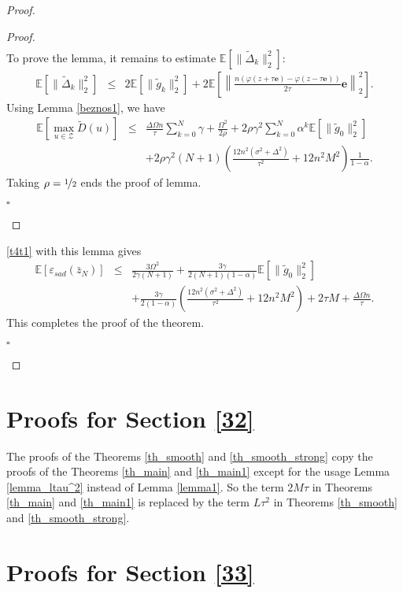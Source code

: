 \documentclass[runningheads]{llncs}
\newcommand{\EndProof}{\begin{flushright}$\square$\end{flushright}}
\begin{document}
\begin{proof}
\begin{proof}
\begin{eqnarray*}
\end{eqnarray*}
To prove the lemma, it remains to estimate $\mathbb{E}\left[\|\tilde \Delta_k\|_2^2\right]$:
\begin{eqnarray*}
    \mathbb{E}\left[\|\tilde \Delta_k\|_2^2\right] &\leq&  2 \mathbb{E}\left[\| \tilde g_k\|_2^2\right] +  2 \mathbb{E}\left[\left\|\frac{n\left(\varphi(z + \tau \mathbf{e}) -  \varphi(z - \tau \mathbf{e})\right)}{2\tau}\mathbf{e}\right\|_2^2\right]
    .  
\end{eqnarray*}
Using Lemma \ref{beznos1},  we have 
\begin{eqnarray*}
    \mathbb{E}\left[\max_{u \in \mathcal{Z}} \tilde D(u)\right] &\leq& \frac{\Delta \Omega n}{\tau}\sum\limits_{k=0}^N \gamma + \frac{\Omega^2}{2\rho} + 2\rho \gamma^2\sum\limits_{k=0}^N \alpha^k\mathbb{E}\left[\|\tilde g_{0}\|^2_2 \right] \nonumber\\
    &&+ 2\rho \gamma^2 (N+1)\left(\frac{12n^2 (\sigma^2 + \Delta^2)}{\tau^2}+ 12n^2M^2\right) \frac{1}{1 - \alpha}.  
\end{eqnarray*}
Taking $\rho = \nicefrac{1}{2}$ ends the proof of lemma.
\EndProof
\end{proof}
\eqref{t4t1} with this lemma gives
\begin{eqnarray*}
    \mathbb{E}\left[\varepsilon_{sad}(\bar z_N)\right] &\leq&
     \frac{3\Omega^2}{2\gamma(N+1)} + \frac{3\gamma}{2(N+1)(1 - \alpha)} \mathbb{E}\left[\|\tilde g_{0}\|^2_2 \right] \nonumber\\
    && + \frac{3\gamma}{2(1 - \alpha)} \left(\frac{12n^2 (\sigma^2 + \Delta^2)}{\tau^2}+ 12n^2M^2\right)  + 2\tau M  + \frac{\Delta \Omega n}{\tau}.
\end{eqnarray*} 
This completes the proof of the theorem.
\EndProof
\end{proof}

\section{Proofs for Section \ref{32}}
The proofs of the Theorems \ref{th_smooth} and \ref{th_smooth_strong} copy the proofs of the Theorems \ref{th_main} and \ref{th_main1} except for the usage Lemma \ref{lemma_ltau^2} instead of Lemma \ref{lemma1}. So the term $2M\tau$ in Theorems \ref{th_main} and \ref{th_main1} is  replaced by the term $L\tau^2$ in Theorems \ref{th_smooth} and \ref{th_smooth_strong}.


\section{Proofs for Section \ref{33}}
\end{document}
